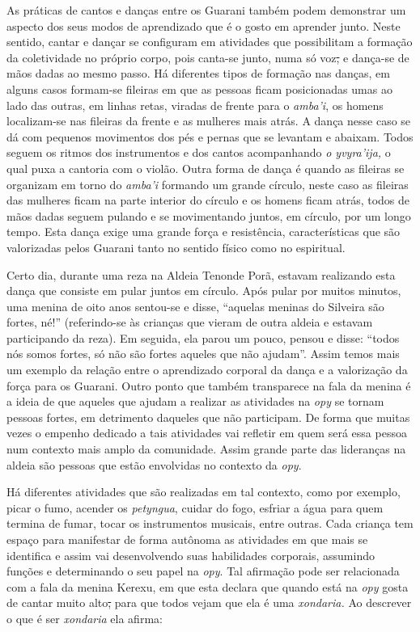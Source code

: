 As práticas de cantos e danças entre os Guarani também podem demonstrar
um aspecto dos seus modos de aprendizado que é o gosto em aprender
junto. Neste sentido, cantar e dançar se configuram em atividades que
possibilitam a formação da coletividade no próprio corpo, pois canta-se
junto, numa só voz\sout{,} e dança-se de mãos dadas ao mesmo passo. Há
diferentes tipos de formação nas danças, em alguns casos formam-se
fileiras em que as pessoas ficam posicionadas umas ao lado das outras,
em linhas retas, viradas de frente para o \emph{amba'i}, os homens
localizam-se nas fileiras da frente e as mulheres mais atrás. A dança
nesse caso se dá com pequenos movimentos dos pés e pernas que se
levantam e abaixam. Todos seguem os ritmos dos instrumentos e dos cantos
acompanhando \emph{o yvyra'ija,} o qual puxa a cantoria com o violão.
Outra forma de dança é quando as fileiras se organizam em torno do
\emph{amba'i} formando um grande círculo, neste caso as fileiras das
mulheres ficam na parte interior do círculo e os homens ficam atrás,
todos de mãos dadas seguem pulando e se movimentando juntos, em círculo,
por um longo tempo. Esta dança exige uma grande força e resistência,
características que são valorizadas pelos Guarani tanto no sentido
físico como no espiritual.

Certo dia, durante uma reza na Aldeia Tenonde Porã, estavam realizando
esta dança que consiste em pular juntos em círculo. Após pular por
muitos minutos, uma menina de oito anos sentou-se e disse, ``aquelas
meninas do Silveira são fortes, né!'' (referindo-se às crianças que
vieram de outra aldeia e estavam participando da reza). Em seguida, ela
parou um pouco, pensou e disse: ``todos nós somos fortes, só não são
fortes aqueles que não ajudam''. Assim temos mais um exemplo da relação
entre o aprendizado corporal da dança e a valorização da força para os
Guarani. Outro ponto que também transparece na fala da menina é a ideia
de que aqueles que ajudam a realizar as atividades na \emph{opy} se
tornam pessoas fortes, em detrimento daqueles que não participam. De
forma que muitas vezes o empenho dedicado a tais atividades vai refletir
em quem será essa pessoa num contexto mais amplo da comunidade. Assim
grande parte das lideranças na aldeia são pessoas que estão envolvidas
no contexto da \emph{opy}.

Há diferentes atividades que são realizadas em tal contexto, como por
exemplo, picar o fumo, acender os \emph{petyngua}, cuidar do fogo,
esfriar a água para quem termina de fumar, tocar os instrumentos
musicais, entre outras. Cada criança tem espaço para manifestar de forma
autônoma as atividades em que mais se identifica e assim vai
desenvolvendo suas habilidades corporais, assumindo funções e
determinando o seu papel na \emph{opy}. Tal afirmação pode ser
relacionada com a fala da menina Kerexu, em que esta declara que quando
está na \emph{opy} gosta de cantar muito alto\sout{,} para que todos
vejam que ela é uma \emph{xondaria.} Ao descrever o que é ser
\emph{xondaria} ela afirma:

